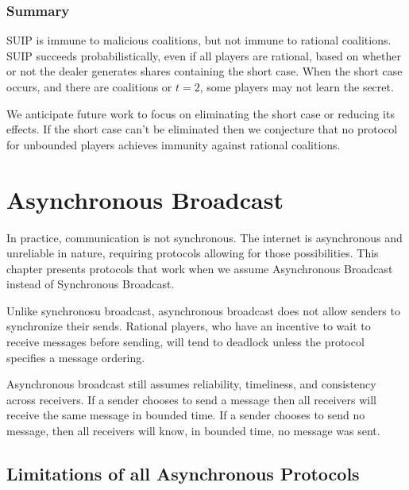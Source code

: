 \documentclass{dalcsthesis}
\begin{document}
\subsection{Summary}

SUIP is immune to malicious coalitions, but not immune to rational coalitions. SUIP succeeds probabilistically, even if all players are rational, based on whether or not the dealer generates shares containing the short case. When the short case occurs, and there are coalitions or $t=2$, some players may not learn the secret.

We anticipate future work to focus on eliminating the short case or reducing its effects. If the short case can't be eliminated then we conjecture that no protocol for unbounded players achieves immunity against rational coalitions.




\chapter{Asynchronous Broadcast}

In practice, communication is not synchronous. The internet is asynchronous and unreliable in nature, requiring protocols allowing for those possibilities. This chapter presents protocols that work when we assume Asynchronous Broadcast instead of Synchronous Broadcast.

Unlike synchronosu broadcast, asynchronous broadcast does not allow senders to synchronize their sends. Rational players, who have an incentive to wait to receive messages before sending, will tend to deadlock unless the protocol specifies a message ordering.

Asynchronous broadcast still assumes reliability, timeliness, and consistency across receivers. If a sender chooses to send a message then all receivers will receive the same message in bounded time. If a sender chooses to send no message, then all receivers will know, in bounded time, no message was sent.

\section{Limitations of all Asynchronous Protocols}
\end{document}
